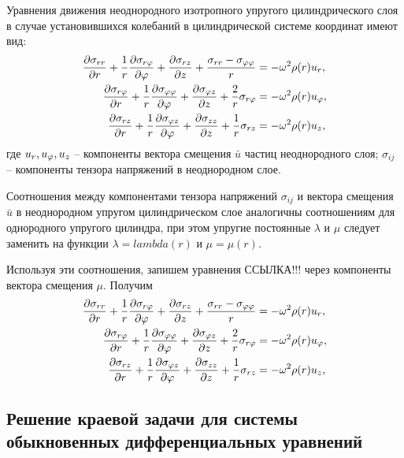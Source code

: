 Уравнения движения неоднородного изотропного упругого цилиндрического слоя в случае установившихся колебаний в цилиндрической системе координат имеют вид:
\begin{equation}
\begin{aligned}
\frac{\partial\sigma_{rr}}{
\partial r}+\frac{1}{r}\frac{\partial\sigma_{r\varphi}}{\partial\varphi}+\frac{\partial\sigma_{rz}}{\partial z}+\frac{\sigma_{rr}-\sigma_{\varphi\varphi}}{r}&=-\omega^2\rho(r)u_r,\\
\frac{\partial\sigma_{r\varphi}}{
\partial r}+\frac{1}{r}\frac{\partial\sigma_{\varphi\varphi}}{\partial\varphi}+\frac{\partial\sigma_{\varphi z}}{\partial z}+\frac{2}{r}\sigma_{r\varphi}&=-\omega^2\rho(r)u_{\varphi},\\
\frac{\partial\sigma_{rz}}{
\partial r}+\frac{1}{r}\frac{\partial\sigma_{\varphi z}}{\partial\varphi}+\frac{\partial\sigma_{zz}}{\partial z}+\frac{1}{r}\sigma_{rz}&=-\omega^2\rho(r)u_z,
\end{aligned}
\end{equation}
где $u_r, u_{\varphi}, u_z$ -- компоненты вектора смещения $\bar{u}$ частиц неоднородного слоя; $\sigma_{ij}$ -- компоненты тензора напряжений в неоднородном слое.

Соотношения между компонентами тензора напряжений $\sigma_{ij}$ и вектора смещения $\bar{u}$ в неоднородном упругом цилиндрическом слое аналогичны соотношениям для однородного упругого цилиндра, при этом упругие постоянные $\lambda$ и $\mu$ следует заменить на функции $\lambda=lambda(r)$ и $\mu=\mu(r).$

Используя эти соотношения, запишем уравнения ССЫЛКА!!! через компоненты вектора смещения $\mu.$ Получим
\begin{equation}
\begin{aligned}
\frac{\partial\sigma_{rr}}{
\partial r}+\frac{1}{r}\frac{\partial\sigma_{r\varphi}}{\partial\varphi}+\frac{\partial\sigma_{rz}}{\partial z}+\frac{\sigma_{rr}-\sigma_{\varphi\varphi}}{r}&=-\omega^2\rho(r)u_r,\\
\frac{\partial\sigma_{r\varphi}}{
\partial r}+\frac{1}{r}\frac{\partial\sigma_{\varphi\varphi}}{\partial\varphi}+\frac{\partial\sigma_{\varphi z}}{\partial z}+\frac{2}{r}\sigma_{r\varphi}&=-\omega^2\rho(r)u_{\varphi},\\
\frac{\partial\sigma_{rz}}{
\partial r}+\frac{1}{r}\frac{\partial\sigma_{\varphi z}}{\partial\varphi}+\frac{\partial\sigma_{zz}}{\partial z}+\frac{1}{r}\sigma_{rz}&=-\omega^2\rho(r)u_z,
\end{aligned}
\end{equation}
\newpage
\subsection{Решение краевой задачи для системы обыкновенных дифференциальных уравнений}

